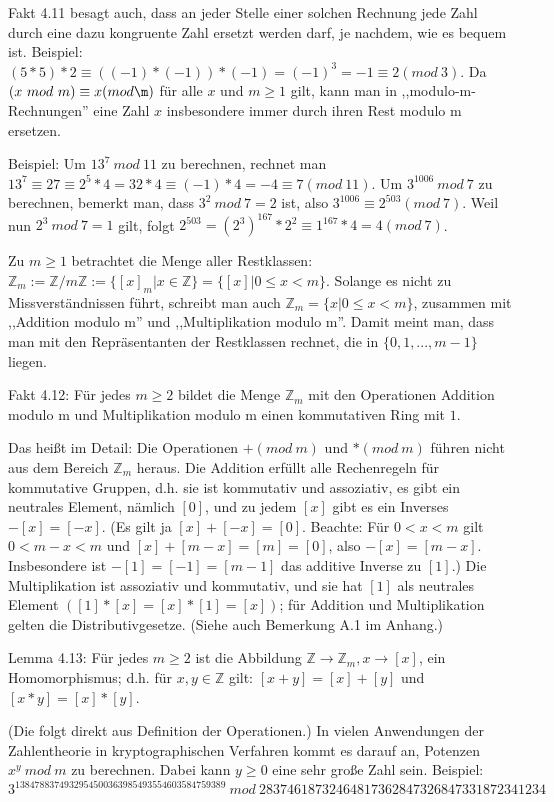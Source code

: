 \documentclass[a4paper]{article}
\begin{document}
\begin{multicols}{3}
    Fakt 4.11 besagt auch, dass an jeder Stelle einer solchen Rechnung jede Zahl durch eine dazu kongruente Zahl ersetzt werden darf, je nachdem, wie es bequem ist. Beispiel: $(5*5)* 2 \equiv((-1)*(-1))*(-1) = (-1)^3 =- 1 \equiv 2 (mod\ 3)$. Da $(x\ mod\ m)\equiv x(mod\m)$ für alle $x$ und $m\geq 1$ gilt, kann man in ,,modulo-m-Rechnungen'' eine Zahl $x$ insbesondere immer durch ihren Rest modulo m ersetzen.

    Beispiel: Um $13^7\ mod\ 11$ zu berechnen, rechnet man $13^7\equiv 27\equiv 2^5*4 =32* 4\equiv (-1)*4 = -4\equiv 7(mod\ 11)$. Um $3^{1006}\ mod\ 7$ zu berechnen, bemerkt man, dass $3^2\ mod\ 7=2$ ist, also $3^{1006}\equiv 2^{503}(mod\ 7)$. Weil nun $2^3\ mod\ 7=1$ gilt, folgt $2^{503}=(2^3)^{167} * 2^2 \equiv  1^{167}*4=4(mod\ 7)$.

    Zu $m\geq 1$ betrachtet die Menge aller Restklassen: $\mathbb{Z}_m:=\mathbb{Z}/m\mathbb{Z}:=\{[x]_m|x\in\mathbb{Z}\}=\{[x]| 0 \leq x<m\}$. Solange es nicht zu Missverständnissen führt, schreibt man auch $\mathbb{Z}_m=\{x|0 \leq x < m\}$, zusammen mit ,,Addition modulo m'' und ,,Multiplikation modulo m''. Damit meint man, dass man mit den Repräsentanten der Restklassen rechnet, die in $\{0,1 ,...,m-1\}$ liegen.

    Fakt 4.12: Für jedes $m\geq 2$ bildet die Menge $\mathbb{Z}_m$ mit den Operationen Addition modulo m und Multiplikation modulo m einen kommutativen Ring mit $1$.

    Das heißt im Detail: Die Operationen $+(mod\ m)$ und $*(mod\ m)$ führen nicht aus dem Bereich $\mathbb{Z}_m$ heraus. Die Addition erfüllt alle Rechenregeln für kommutative Gruppen, d.h. sie ist kommutativ und assoziativ, es gibt ein neutrales Element, nämlich $[0]$, und zu jedem $[x]$ gibt es ein Inverses $-[x]=[-x]$. (Es gilt ja $[x] + [-x] = [0]$. Beachte: Für $0 < x < m$ gilt $0< m-x < m$ und $[x]+[m-x]=[m]=[0]$, also $-[x]=[m-x]$. Insbesondere ist $-[1]=[-1]=[m-1]$ das additive Inverse zu $[1]$.) Die Multiplikation ist assoziativ und kommutativ, und sie hat $[1]$ als neutrales Element $([1]*[x] = [x]*[1] = [x])$; für Addition und Multiplikation gelten die Distributivgesetze. (Siehe auch Bemerkung A.1 im Anhang.)

    Lemma 4.13: Für jedes $m\geq 2$ ist die Abbildung $\mathbb{Z}\rightarrow\mathbb{Z}_m ,x\rightarrow [x]$, ein Homomorphismus; d.h. für $x,y\in\mathbb{Z}$ gilt: $[x+y]=[x]+[y]$ und $[x*y] = [x]*[y]$.

    (Die folgt direkt aus Definition der Operationen.)
    In vielen Anwendungen der Zahlentheorie in kryptographischen Verfahren kommt es darauf an, Potenzen $x^y\ mod\ m$ zu berechnen. Dabei kann $y\geq 0$ eine sehr große Zahl sein. Beispiel: $3^{1384788374932954500363985493554603584759389}\ mod\ 28374618732464817362847326847331872341234$


\end{multicols}
\end{document}
